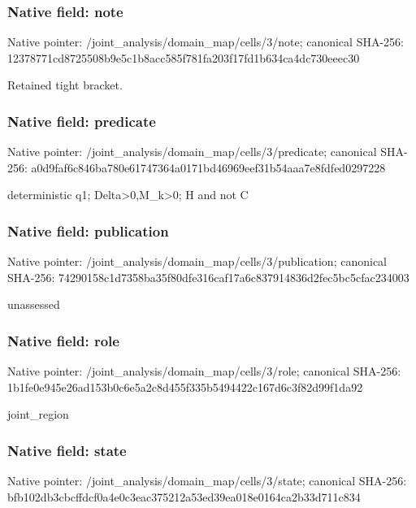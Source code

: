 \documentclass[10pt,a4paper]{article}
\begin{document}
\subsubsection{Native field: note}
Native pointer: /joint\_\allowbreak{}analysis/domain\_\allowbreak{}map/cells/3/note; canonical SHA-256: 12378771cd8725508b9e5c1b8acc585f781fa203f17fd1b634ca4dc730eeec30

\begingroup\raggedright\sloppy Retained tight bracket.\par\endgroup

\subsubsection{Native field: predicate}
Native pointer: /joint\_\allowbreak{}analysis/domain\_\allowbreak{}map/cells/3/predicate; canonical SHA-256: a0d9faf6c846ba780e61747364a0171bd46969eef31b54aaa7e8fdfed0297228

\begingroup\raggedright\sloppy deterministic q1;\allowbreak{} Delta>0,\allowbreak{}M\_\allowbreak{}k>0;\allowbreak{} H and not C\par\endgroup

\subsubsection{Native field: publication}
Native pointer: /joint\_\allowbreak{}analysis/domain\_\allowbreak{}map/cells/3/publication; canonical SHA-256: 74290158c1d7358ba35f80dfe316caf17a6c837914836d2fec5bc5cfac234003

\begingroup\raggedright\sloppy unassessed\par\endgroup

\subsubsection{Native field: role}
Native pointer: /joint\_\allowbreak{}analysis/domain\_\allowbreak{}map/cells/3/role; canonical SHA-256: 1b1fe0e945e26ad153b0c6e5a2c8d455f335b5494422c167d6c3f82d99f1da92

\begingroup\raggedright\sloppy joint\_\allowbreak{}region\par\endgroup

\subsubsection{Native field: state}
Native pointer: /joint\_\allowbreak{}analysis/domain\_\allowbreak{}map/cells/3/state; canonical SHA-256: bfb102db3cbcffdcf0a4e0c3eac375212a53ed39ea018e0164ca2b33d711c834
\end{document}
